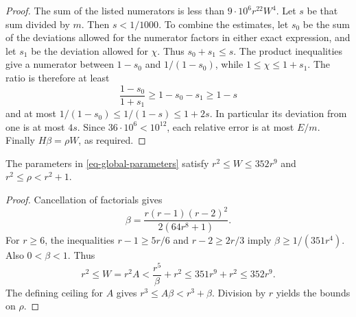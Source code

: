 \begin{proof}
The sum of the listed numerators is less than $9\cdot10^6r^{22}W^4$.
Let $s$ be that sum divided by $m$. Then $s<1/1000$. To combine the
estimates, let $s_0$ be the sum of the deviations allowed for the
numerator factors in either exact expression, and let $s_1$ be the
deviation allowed for $\chi$. Thus $s_0+s_1\le s$.
The product inequalities give a numerator between $1-s_0$ and
$1/(1-s_0)$, while $1\le\chi\le1+s_1$. The ratio is therefore at
least
\[
 \frac{1-s_0}{1+s_1}\ge1-s_0-s_1\ge1-s
\]
and at most $1/(1-s_0)\le1/(1-s)\le1+2s$.
In particular its deviation from one is at most $4s$.
Since $36\cdot10^6<10^{12}$, each relative error is at most $E/m$.
Finally $H\beta=\rho W$, as required.
\end{proof}

\begin{lemma}\label{lem-polynomial-width}
The parameters in \eqref{eq-global-parameters} satisfy
$r^2\le W\le352r^9$ and $r^2\le\rho<r^2+1$.
\end{lemma}
\begin{proof}
Cancellation of factorials gives
\[
 \beta=\frac{r(r-1)(r-2)^2}{2(64r^8+1)}.
\]
For $r\ge6$, the inequalities $r-1\ge5r/6$ and
$r-2\ge2r/3$ imply $\beta\ge1/(351r^4)$.
Also $0<\beta<1$. Thus
\[
 r^2\le W=r^2A<\frac{r^5}{\beta}+r^2
 \le351r^9+r^2\le352r^9.
\]
The defining ceiling for $A$ gives
$r^3\le A\beta<r^3+\beta$. Division by $r$ yields the bounds on
$\rho$.
\end{proof}

